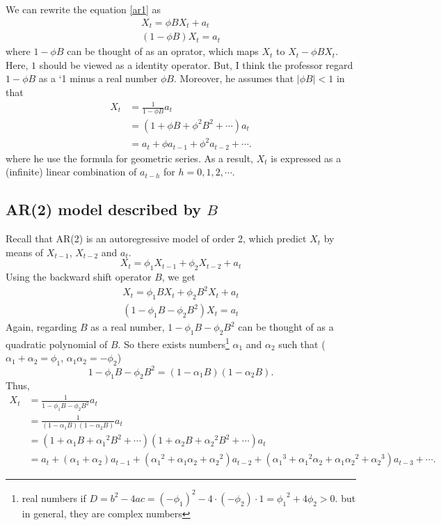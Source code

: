 \documentclass{article}
\newcommand\ar{\ensuremath{\text{AR}}}
\begin{document}
We can rewrite the equation \eqref{ar1} as
\begin{gather*}
X_t=\phi B X_t+a_t\\
(1-\phi B)X_t=a_t
\end{gather*}
where \(1-\phi B\) can be thought of as an oprator, which maps \(X_t\) to \(X_t-\phi BX_t\).
Here, \(1\) should be viewed as a identity operator.
But, I think the professor regard \(1-\phi B\) as a `1 minus a real number \(\phi B\).
Moreover, he assumes that \(|\phi B|<1\) in that
\begin{equation}\label{geometric_series}
\begin{aligned}
X_t
&=\frac1{1-\phi B}a_t\\
&=(1+\phi B+\phi^2B^2+\cdots)a_t\\
&=a_t+\phi a_{t-1}+\phi^2a_{t-2}+\cdots.
\end{aligned}
\end{equation}
where he use the formula for geometric series.\footnotemark
{}
As a result, \(X_t\) is expressed as a (infinite) linear combination of \(a_{t-h}\) for \(h=0,1,2,\cdots\).

%
\subsection{AR(2) model described by \(B\)}
Recall that \ar(2) is an autoregressive model of order 2, which predict \(X_t\) by means of \(X_{t-1}\), \(X_{t-2}\) and \(a_t\).
\begin{equation}\label{ar2}
X_t=\phi_1X_{t-1}+\phi_2X_{t-2}+a_t
\end{equation}
Using the backward shift operator \(B\), we get 
\begin{gather*}
X_t=\phi_1BX_t+\phi_2B^2X_t+a_t\\
(1-\phi_1B-\phi_2B^2)X_t=a_t
\end{gather*}
Again, regarding \(B\) as a real number, \(1-\phi_1B-\phi_2B^2\) can be thought of as a quadratic polynomial of \(B\).
So there exists numbers\footnote{real numbers if \(D=b^2-4ac=(-\phi_1)^2-4\cdot(-\phi_2)\cdot1={\phi_1}^2+4\phi_2>0\). but in general, they are complex numbers} \(\alpha_1\) and \(\alpha_2\) such that (\(\alpha_1+\alpha_2=\phi_1\), \(\alpha_1\alpha_2=-\phi_2\))
\[1-\phi_1B-\phi_2B^2=(1-\alpha_1B)(1-\alpha_2B).\]
Thus,
\begin{align*}
X_t
&=\frac1{1-\phi_1B-\phi_2B^2}a_t\\
&=\frac1{(1-\alpha_1B)(1-\alpha_2B)}a_t\\
&=(1+\alpha_1B+{\alpha_1}^2B^2+\cdots)(1+\alpha_2B+{\alpha_2}^2B^2+\cdots)a_t\\
&=a_t+(\alpha_1+\alpha_2)a_{t-1}+({\alpha_1}^2+\alpha_1\alpha_2+{\alpha_2}^2)a_{t-2}
+({\alpha_1}^3+{\alpha_1}^2\alpha_2+\alpha_1{\alpha_2}^2+{\alpha_2}^3)a_{t-3}+\cdots.
\end{align*}
\end{document}
